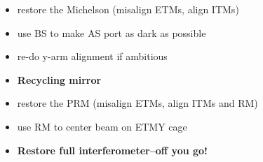 \begin{itemize}
\item restore the Michelson (misalign ETMs, align ITMs) \vspace{-10pt}
\item use BS to make AS port as dark as possible \vspace{-10pt}
\item re-do y-arm alignment if ambitious 
\item[] \textbf{Recycling mirror} \vspace{-10pt}
\item restore the PRM (misalign ETMs, align ITMs and RM)
  \vspace{-10pt}
\item use RM to center beam on ETMY cage 
\item[] \textbf{Restore full interferometer--off you go!}
\end{itemize}











